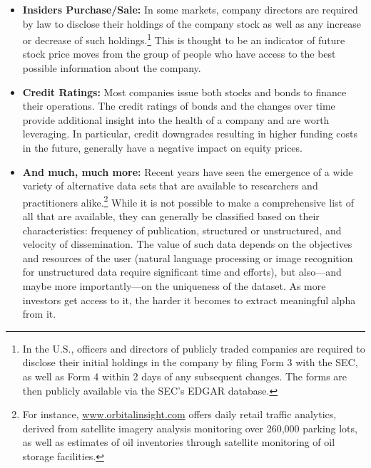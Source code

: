 \begin{itemize}
\item \textbf{Insiders Purchase/Sale:} In some markets, company directors are required by law to disclose their holdings of the company stock as well as any increase or decrease of such holdings.\footnote{In the U.S., officers and directors of publicly traded companies are required to disclose their initial holdings in the company by filing Form 3 with the SEC, as well as Form 4 within 2 days of any subsequent changes. The forms are then publicly available via the SEC's EDGAR database.} This is thought to be an indicator of future stock price moves from the group of people who have access to the best possible information about the company.


\item \textbf{Credit Ratings:} Most companies issue both stocks and bonds to finance their operations. The credit ratings of bonds and the changes over time provide additional insight into the health of a company and are worth leveraging. In particular, credit downgrades resulting in higher funding costs in the future, generally have a negative impact on equity prices.


\item \textbf{And much, much more:} Recent years have seen the emergence of a wide variety of alternative data sets that are available to researchers and practitioners alike.\footnote{For instance, \url{www.orbitalinsight.com} offers daily retail traffic analytics, derived from satellite imagery analysis monitoring over 260,000 parking lots, as well as estimates of oil inventories through satellite monitoring of oil storage facilities.} While it is not possible to make a comprehensive list of all that are available, they can generally be classified based on their characteristics: frequency of publication, structured or unstructured, and velocity of dissemination. The value of such data depends on the objectives and resources of the user (natural language processing or image recognition for unstructured data require significant time and efforts), but also---and maybe more importantly---on the uniqueness of the dataset. As more investors get access to it, the harder it becomes to extract meaningful alpha from it.
\end{itemize}





